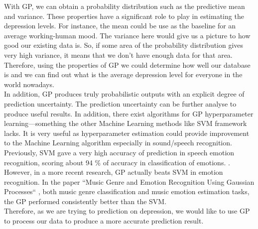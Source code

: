 \documentclass{article}
\begin{document}
	With GP, we can obtain a probability distribution such as the predictive mean and variance. 
	These properties have a signiﬁcant role to play in estimating the depression levels. For instance, 
	the mean could be use as the baseline for an average working-human mood. The variance here would give us a picture to how good our existing data is. 
	So, if some area of the probability distribution gives very high variance, it means that we don’t have enough data for that area. 
	Therefore, using the properties of GP we could determine how well our database is and we can find out what is the average depression level for 
	everyone in the world nowadays. \\

	In addition, GP produces truly probabilistic outputs with an explicit degree of prediction uncertainty. 
	The prediction uncertainty can be further analyse to produce useful results. In addition, there exist algorithms for GP hyperparameter 
	learning—something the other Machine Learning methods like SVM framework lacks. It is very useful as hyperparameter estimation could provide 
	improvement to the Machine Learning algorithm especially in sound/speech recognition. \cite{Hashimoto2015} \\

	Previously,  SVM gave a very high accuracy of prediction in speech emotion recognition, scoring about 94 \% 
	of accuracy in classification of emotions. \cite{Chavhan2010}. However, in a more recent research, GP actually beats SVM in emotion recognition. 
	In the paper  “Music Genre and Emotion Recognition Using Gaussian Processes“ \cite{MARKOV2013}, 
	both music genre classification and music emotion estimation tasks, the GP performed consistently better than the SVM. \\

	Therefore, as we are trying to prediction on depression, we would like to use GP to process our data to produce a more accurate prediction result. 
	
\end{document}
